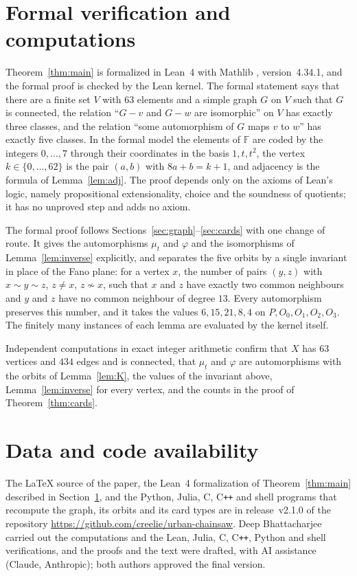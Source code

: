 \documentclass[preprint,12pt]{elsarticle}
\theoremstyle{definition}
\newcommand{\F}{\mathbb{F}}
\begin{document}
\section{Formal verification and computations}\label{sec:lean}

Theorem~\ref{thm:main} is formalized in Lean~4 \cite{MU21} with Mathlib \cite{Mathlib20}, version~4.34.1, and the formal proof is checked by the Lean kernel. The formal statement says that there are a finite set $V$ with $63$ elements and a simple graph $G$ on $V$ such that $G$ is connected, the relation ``$G-v$ and $G-w$ are isomorphic'' on $V$ has exactly three classes, and the relation ``some automorphism of $G$ maps $v$ to $w$'' has exactly five classes. In the formal model the elements of $\F$ are coded by the integers $0,\dots,7$ through their coordinates in the basis $1,t,t^2$, the vertex $k\in\{0,\dots,62\}$ is the pair $(a,b)$ with $8a+b=k+1$, and adjacency is the formula of Lemma~\ref{lem:adj}. The proof depends only on the axioms of Lean's logic, namely propositional extensionality, choice and the soundness of quotients; it has no unproved step and adds no axiom.

The formal proof follows Sections~\ref{sec:graph}--\ref{sec:cards} with one change of route. It gives the automorphisms $\mu_t$ and $\varphi$ and the isomorphisms of Lemma~\ref{lem:inverse} explicitly, and separates the five orbits by a single invariant in place of the Fano plane: for a vertex $x$, the number of pairs $(y,z)$ with $x\sim y\sim z$, $z\ne x$, $z\not\sim x$, such that $x$ and $z$ have exactly two common neighbours and $y$ and $z$ have no common neighbour of degree $13$. Every automorphism preserves this number, and it takes the values $6,15,21,8,4$ on $P,O_0,O_1,O_2,O_3$. The finitely many instances of each lemma are evaluated by the kernel itself.

Independent computations in exact integer arithmetic confirm that $X$ has $63$ vertices and $434$ edges and is connected, that $\mu_t$ and $\varphi$ are automorphisms with the orbits of Lemma~\ref{lem:K}, the values of the invariant above, Lemma~\ref{lem:inverse} for every vertex, and the counts in the proof of Theorem~\ref{thm:cards}.

\section*{Data and code availability}
\begingroup\raggedright
The \LaTeX{} source of the paper, the Lean~4 formalization of Theorem~\ref{thm:main} described in Section~\ref{sec:lean}, and the Python, Julia, C, C\texttt{++} and shell programs that recompute the graph, its orbits and its card types are in release~v2.1.0 of the repository \url{https://github.com/creelie/urban-chainsaw}. Deep Bhattacharjee carried out the computations and the Lean, Julia, C, C\texttt{++}, Python and shell verifications, and the proofs and the text were drafted, with AI assistance (Claude, Anthropic); both authors approved the final version.\par
\endgroup
\end{document}
